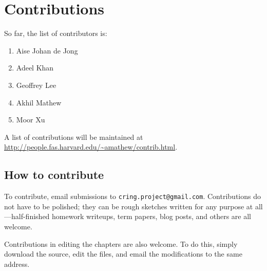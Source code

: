 \chapter*{Contributions}

So far, the list of contributors is:
\begin{enumerate}
\item Aise Johan de Jong
\item Adeel Khan 
\item Geoffrey Lee
\item Akhil Mathew
\item Moor Xu
\end{enumerate}

A list of contributions will be maintained at 
\url{http://people.fas.harvard.edu/~amathew/contrib.html}.

\section*{How to contribute}


To contribute, email submissions to \verb=cring.project@gmail.com=. 
Contributions do not have to be polished; they can be rough sketches written
for any purpose at all---half-finished homework writeups, term papers, blog
posts, and others are all welcome.

Contributions in editing the chapters are also welcome. To do this, simply
download the source, edit the files, and email the modifications to the same
address.


\fancyfoot[C]{\small \textbf{\thepage}}


